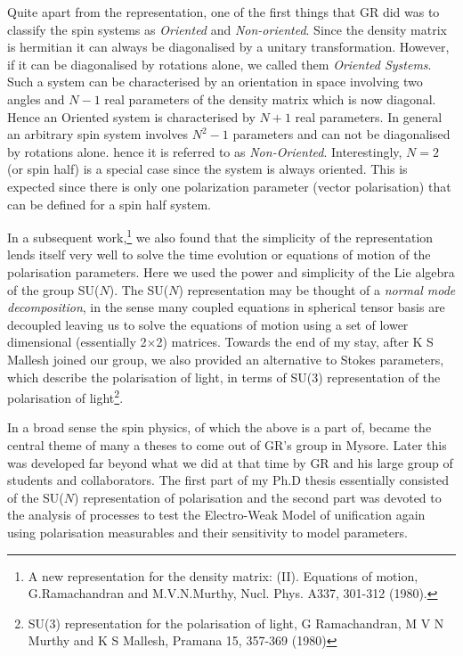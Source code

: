 Quite apart from the representation, one of the first things that GR did was to classify the spin systems as \textit{Oriented} and \textit{Non-oriented}. Since the density matrix is hermitian it can always be diagonalised by a unitary transformation. However, if it can be diagonalised by rotations alone, we called them \textit{Oriented Systems}. Such a system can be characterised by an orientation in space involving two angles and $N-1$ real parameters of the density matrix which is now diagonal. Hence an Oriented system is characterised by $N+1$ real parameters. In general an arbitrary spin system involves $N^{2}-1$ parameters and can not be diagonalised by rotations alone. hence it is referred to as \textit{Non-Oriented}. Interestingly, $N=2$ (or spin half) is a special case since the system is always oriented. This is expected since there is only one polarization parameter (vector polarisation) that can be defined for a spin half system.

In a subsequent work,\footnote{A new representation for the density matrix: (II). Equations of motion, G.Ramachandran and M.V.N.Murthy, Nucl. Phys. A337, 301-312 (1980).} we also found that the simplicity of the representation lends itself very well to solve the time evolution or equations of motion of the polarisation parameters. Here we used the power and simplicity of the Lie algebra of the group SU($N$). The SU($N$) representation may be thought of a \textit{normal mode decomposition}, in the sense many coupled equations in spherical tensor basis are decoupled leaving us to solve the equations of motion using a set of lower dimensional (essentially 2$\times$2) matrices. Towards the end of my stay, after K S Mallesh joined our group, we also provided an alternative to Stokes parameters, which describe the polarisation of light, in terms of SU(3) representation of the polarisation of light\footnote{SU(3) representation for the polarisation of light, G Ramachandran, M V N Murthy and K S Mallesh, Pramana 15, 357-369 (1980)}.

In a broad sense the spin physics, of which the above is a part of, became the central theme of many a theses to come out of GR’s group in Mysore. Later this was developed far beyond what we did at that time by GR and his large group of students and collaborators. The first part of my Ph.D thesis essentially consisted of the SU($N$) representation of polarisation and the second part was devoted to the analysis of processes to test the Electro-Weak Model of unification again using polarisation measurables and their sensitivity to model parameters.

